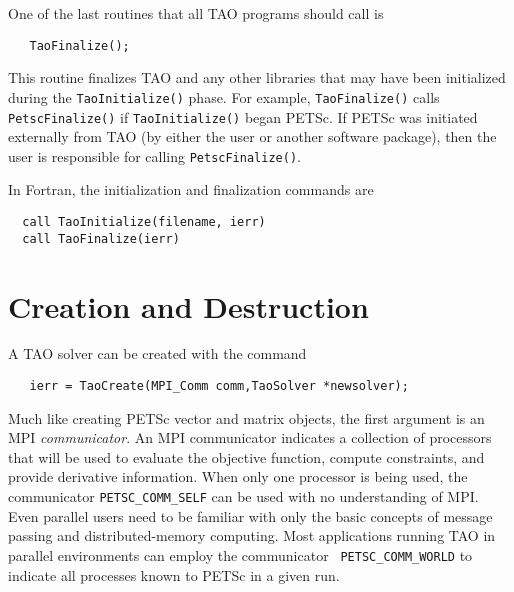 One of the last routines that all TAO programs should 
call is 
\begin{verbatim}
   TaoFinalize();
\end{verbatim}
\noindent
This routine finalizes TAO and any other libraries that may have been
initialized during the {\tt TaoInitialize()} phase.
For example, {\tt TaoFinalize()}
calls {\tt PetscFinalize()} 
if {\tt TaoInitialize()}
began PETSc. If PETSc was initiated externally from TAO (by either
the user or another software package), then the user is
responsible for calling {\tt PetscFinalize()}. 

In Fortran, the initialization and finalization commands are
\begin{verbatim}
  call TaoInitialize(filename, ierr)
  call TaoFinalize(ierr)
\end{verbatim}

\section{Creation and Destruction}

A TAO solver can be created with
the command 
\begin{verbatim}
   ierr = TaoCreate(MPI_Comm comm,TaoSolver *newsolver);
\end{verbatim}
\noindent
Much like creating PETSc vector and matrix objects, 
the first argument is an MPI {\em communicator}.
An MPI \cite{using-mpi} communicator
indicates a collection of processors that will be used to evaluate the
objective function, compute constraints, and provide derivative information.
When only one processor is being used, the communicator {\tt PETSC\_COMM\_SELF}
can be used with no understanding of MPI.
Even parallel users need to be familiar with only the basic concepts 
of message passing and  distributed-memory computing. 
Most applications running TAO in
parallel environments can employ the communicator {\tt
PETSC\_COMM\_WORLD} to indicate all processes known to PETSc in a given run.

